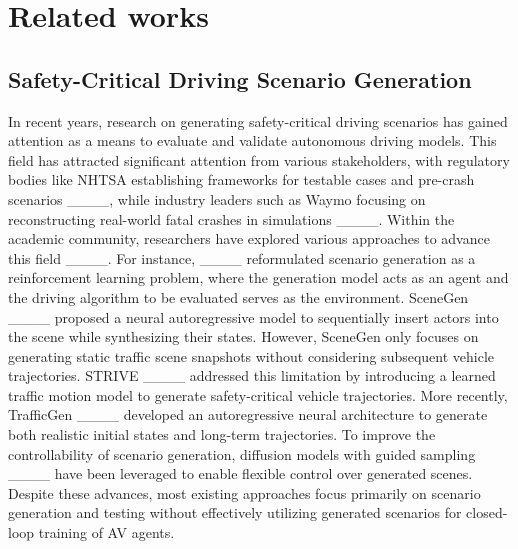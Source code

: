 \section{Related works}
\label{sec2}
\subsection{Safety-Critical Driving Scenario Generation}

In recent years, research on generating safety-critical driving scenarios has gained attention as a means to evaluate and validate autonomous driving models. This field has attracted significant attention from various stakeholders, with regulatory bodies like NHTSA establishing frameworks for testable cases and pre-crash scenarios ____, while industry leaders such as Waymo focusing on reconstructing real-world fatal crashes in simulations ____. Within the academic community, researchers have explored various approaches to advance this field ____. For instance, ____ reformulated scenario generation as a reinforcement learning problem, where the generation model acts as an agent and the driving algorithm to be evaluated serves as the environment. SceneGen ____ proposed a neural autoregressive model to sequentially insert actors into the scene while synthesizing their states. However, SceneGen only focuses on generating static traffic scene snapshots without considering subsequent vehicle trajectories. STRIVE ____ addressed this limitation by introducing a learned traffic motion model to generate safety-critical vehicle trajectories. More recently, TrafficGen ____ developed an autoregressive neural architecture to generate both realistic initial states and long-term trajectories. To improve the controllability of scenario generation, diffusion models with guided sampling ____ have been leveraged to enable flexible control over generated scenes. Despite these advances, most existing approaches focus primarily on scenario generation and testing without effectively utilizing generated scenarios for closed-loop training of AV agents.


